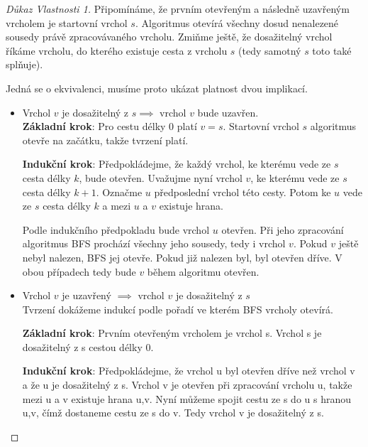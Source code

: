 \begin{proof}[Důkaz Vlastnosti 1]
Připomínáme, že prvním otevřeným a následně uzavřeným vrcholem je startovní vrchol $s$. Algoritmus otevírá všechny dosud nenalezené sousedy právě zpracovávaného vrcholu. Zmiňme ještě, že dosažitelný vrchol říkáme vrcholu, do kterého existuje cesta z vrcholu $s$ (tedy samotný $s$ toto také splňuje).

Jedná se o ekvivalenci, musíme proto ukázat platnost dvou implikací.

\begin{itemize}
    \item Vrchol $v$ je dosažitelný z $s \implies$ vrchol $v$ bude uzavřen. \\

    \textbf{Základní krok}: Pro cestu délky $0$ platí $v=s$.
    Startovní vrchol $s$ algoritmus otevře na začátku, takže tvrzení platí.

    \textbf{Indukční krok}: Předpokládejme, že každý vrchol, ke kterému
    vede ze $s$ cesta délky $k$, bude otevřen. Uvažujme nyní vrchol $v$,
    ke kterému vede ze $s$ cesta délky $k+1$. Označme $u$ předposlední
    vrchol této cesty. Potom ke $u$ vede ze $s$ cesta délky $k$ a mezi
    $u$ a $v$ existuje hrana.

    Podle indukčního předpokladu bude vrchol $u$ otevřen. Při jeho
    zpracování algoritmus BFS prochází všechny jeho sousedy, tedy i
    vrchol $v$. Pokud $v$ ještě nebyl nalezen, BFS jej otevře. Pokud
    již nalezen byl, byl otevřen dříve. V obou případech tedy bude
    $v$ během algoritmu otevřen.

    \item Vrchol $v$ je uzavřený $\implies$ vrchol $v$ je dosažitelný z $s$ \\
    Tvrzení dokážeme indukcí podle pořadí ve kterém BFS vrcholy otevírá.
    
    \textbf{Základní krok}: Prvním otevřeným vrcholem je vrchol s. Vrchol s je dosažitelný z s cestou délky 0.

    \textbf{Indukční krok}: Předpokládejme, že vrchol u byl otevřen dříve než vrchol v a že u je dosažitelný z s. Vrchol v je otevřen při zpracování vrcholu u, takže mezi u a v existuje hrana {u,v}. Nyní můžeme spojit cestu ze s do u s hranou {u,v}, čímž dostaneme cestu ze s do v. Tedy vrchol v je dosažitelný z s.
\end{itemize}
\end{proof}

\bigskip

